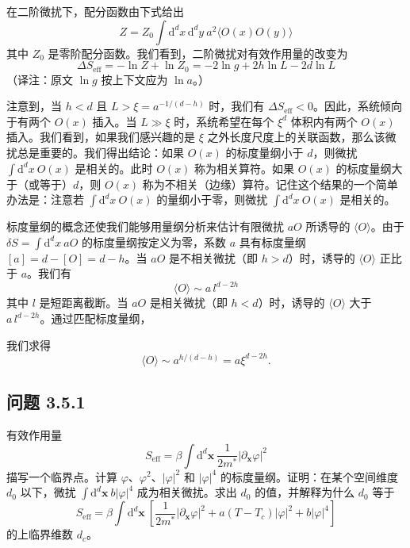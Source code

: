 在二阶微扰下，配分函数由下式给出
\begin{equation*}
Z = Z_{0} \int \mathrm{d}^{d}x\,\mathrm{d}^{d}y\ a^{2}\langle O(x)O(y)\rangle
\end{equation*}
其中 $Z_{0}$ 是零阶配分函数。我们看到，二阶微扰对有效作用量的改变为
\begin{equation*}
\Delta S_{\mathrm{eff}} = -\ln Z + \ln Z_{0} = -2\ln g + 2h\ln L - 2d\ln L
\end{equation*}
（译注：原文 $\ln g$ 按上下文应为 $\ln a$。）

注意到，当 $h < d$ 且 $L > \xi = a^{-1/(d-h)}$ 时，我们有 $\Delta S_{\mathrm{eff}} < 0$。因此，系统倾向于有两个 $O(x)$ 插入。当 $L \gg \xi$ 时，系统希望在每个 $\xi^{d}$ 体积内有两个 $O(x)$ 插入。我们看到，如果我们感兴趣的是 $\xi$ 之外长度尺度上的关联函数，那么该微扰总是重要的。我们得出结论：如果 $O(x)$ 的标度量纲小于 $d$，则微扰 $\int \mathrm{d}^{d}x\ O(x)$ 是相关的。此时 $O(x)$ 称为相关算符。如果 $O(x)$ 的标度量纲大于（或等于）$d$，则 $O(x)$ 称为不相关（边缘）算符。记住这个结果的一个简单办法是：注意若 $\int \mathrm{d}^{d}x\ O(x)$ 的量纲小于零，则微扰 $\int \mathrm{d}^{d}x\ O(x)$ 是相关的。

标度量纲的概念还使我们能够用量纲分析来估计有限微扰 $aO$ 所诱导的 $\langle O\rangle$。由于 $\delta S = \int \mathrm{d}^{d}x\ aO$ 的标度量纲按定义为零，系数 $a$ 具有标度量纲 $[a] = d - [O] = d - h$。当 $aO$ 是不相关微扰（即 $h > d$）时，诱导的 $\langle O\rangle$ 正比于 $a$。我们有
\begin{equation*}
\langle O\rangle \sim a\,l^{d-2h}
\end{equation*}
其中 $l$ 是短距离截断。当 $aO$ 是相关微扰（即 $h < d$）时，诱导的 $\langle O\rangle$ 大于 $a\,l^{d-2h}$。通过匹配标度量纲，

我们求得
\begin{equation*}
\langle O\rangle \sim a^{h/(d-h)} = a\xi^{d-2h}.
\tag{3.5.2}
\end{equation*}

\subsection*{问题 3.5.1}
有效作用量
\begin{equation*}
S_{\mathrm{eff}} = \beta\int \mathrm{d}^{d}\pmb{x}\ \frac{1}{2m^{*}}|\partial_{\pmb{x}}\varphi|^{2}
\end{equation*}
描写一个临界点。计算 $\varphi$、$\varphi^{2}$、$|\varphi|^{2}$ 和 $|\varphi|^{4}$ 的标度量纲。证明：在某个空间维度 $d_{0}$ 以下，微扰 $\int \mathrm{d}^{d}\pmb{x}\ b|\varphi|^{4}$ 成为相关微扰。求出 $d_{0}$ 的值，并解释为什么 $d_{0}$ 等于
\begin{equation*}
S_{\mathrm{eff}} = \beta\int \mathrm{d}^{d}\pmb{x}\ \left[ \frac{1}{2m^{*}}|\partial_{\pmb{x}}\varphi|^{2} + a(T-T_{c})|\varphi|^{2} + b|\varphi|^{4} \right]
\end{equation*}
的上临界维数 $d_{c}$。

